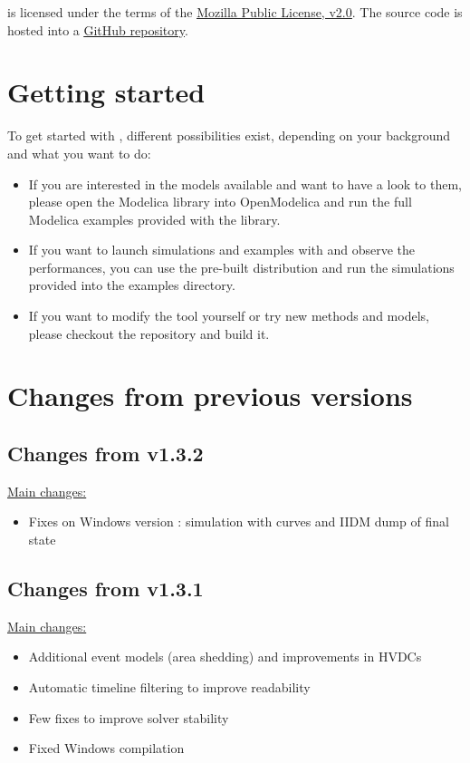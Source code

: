 \documentclass[a4paper, 12pt]{report}
\begin{document}
\Dynawo is licensed under the terms of the \href{http://mozilla.org/MPL/2.0}{\underline{Mozilla Public License, v2.0}}.
The source code is hosted into a \href{https://github.com/dynawo/dynawo} {\underline{GitHub repository}}. \\

\section{Getting started}

To get started with \Dynawo , different possibilities exist, depending on your background and what you want to do:
\begin{itemize}
\item If you are interested in the models available and want to have a look to them, please open the \Dynawo Modelica library into OpenModelica and run the full Modelica examples provided with the library.
\item If you want to launch simulations and examples with \Dynawo and observe the performances, you can use the pre-built distribution and run the simulations provided into the examples directory.
\item If you want to modify the tool yourself or try new methods and models, please checkout the repository and build it.
\end{itemize}

\section{Changes from previous versions}

\subsection{Changes from v1.3.2}

\underline{Main changes:}
\begin{itemize}
\item Fixes on Windows version : simulation with curves and IIDM dump of final state
\end{itemize}

\subsection{Changes from v1.3.1}

\underline{Main changes:}
\begin{itemize}
\item Additional event models (area shedding) and improvements in HVDCs
\item Automatic timeline filtering to improve readability
\item Few fixes to improve solver stability
\item Fixed Windows compilation
\end{itemize}
\end{document}
